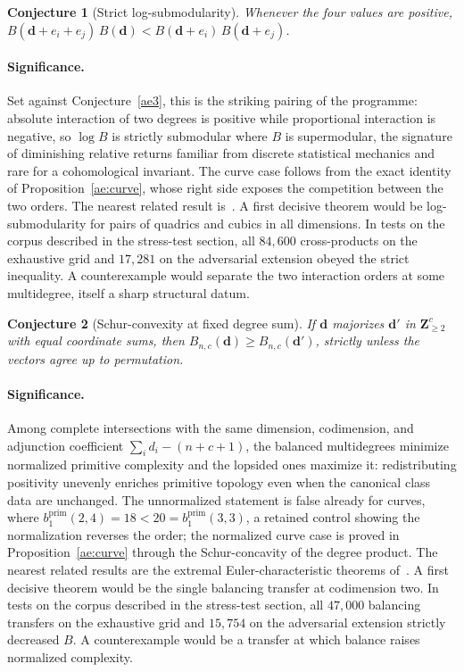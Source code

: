 \documentclass[11pt]{article}
\newtheorem{conjecture}{Conjecture}
\theoremstyle{definition}
\begin{document}
\begin{conjecture}[Strict log-submodularity]\label{ae4}
Whenever the four values are positive, $B(\mathbf d+e_i+e_j)\,B(\mathbf d)<B(\mathbf d+e_i)\,B(\mathbf d+e_j)$.
\end{conjecture}

\paragraph{Significance.}
Set against Conjecture~\ref{ae3}, this is the striking pairing of the programme: absolute interaction of two degrees is positive while proportional interaction is negative, so $\log B$ is strictly submodular where $B$ is supermodular, the signature of diminishing relative returns familiar from discrete statistical mechanics and rare for a cohomological invariant.  The curve case follows from the exact identity of Proposition~\ref{ae:curve}, whose right side exposes the competition between the two orders.  The nearest related result is~\cite{GL02}.  A first decisive theorem would be log-submodularity for pairs of quadrics and cubics in all dimensions.  In tests on the corpus described in the stress-test section, all $84{,}600$ cross-products on the exhaustive grid and $17{,}281$ on the adversarial extension obeyed the strict inequality.  A counterexample would separate the two interaction orders at some multidegree, itself a sharp structural datum.

\begin{conjecture}[Schur-convexity at fixed degree sum]\label{ae5}
If $\mathbf d$ majorizes $\mathbf d'$ in $\mathbf Z_{\ge2}^c$ with equal coordinate sums, then $B_{n,c}(\mathbf d)\ge B_{n,c}(\mathbf d')$, strictly unless the vectors agree up to permutation.
\end{conjecture}

\paragraph{Significance.}
Among complete intersections with the same dimension, codimension, and adjunction coefficient $\sum_id_i-(n+c+1)$, the balanced multidegrees minimize normalized primitive complexity and the lopsided ones maximize it: redistributing positivity unevenly enriches primitive topology even when the canonical class data are unchanged.  The unnormalized statement is false already for curves, where $b_1^{\mathrm{prim}}(2,4)=18<20=b_1^{\mathrm{prim}}(3,3)$, a retained control showing the normalization reverses the order; the normalized curve case is proved in Proposition~\ref{ae:curve} through the Schur-concavity of the degree product.  The nearest related results are the extremal Euler-characteristic theorems of~\cite{CO75}.  A first decisive theorem would be the single balancing transfer at codimension two.  In tests on the corpus described in the stress-test section, all $47{,}000$ balancing transfers on the exhaustive grid and $15{,}754$ on the adversarial extension strictly decreased $B$.  A counterexample would be a transfer at which balance raises normalized complexity.
\end{document}
